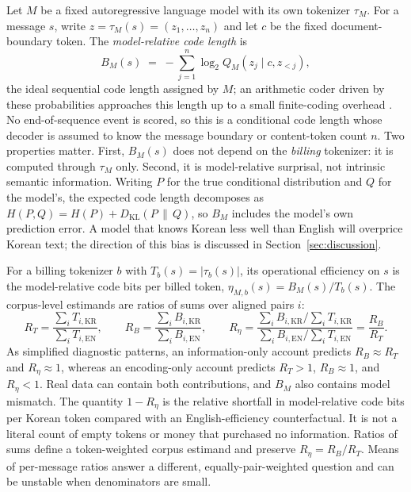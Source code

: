 \documentclass[11pt,a4paper]{article}
\newcommand{\RT}{R_{T}}
\newcommand{\RB}{R_{B}}
\newcommand{\Reta}{R_{\eta}}
\newcommand{\ko}{\mathrm{KR}}
\newcommand{\en}{\mathrm{EN}}
\begin{document}
Let $M$ be a fixed autoregressive language model with its own tokenizer
$\tau_M$. For a message $s$, write $z=\tau_M(s)=(z_1,\dots,z_n)$ and let
$c$ be the fixed document-boundary token. The \emph{model-relative code
length} is
\begin{equation}
  B_M(s) \;=\; -\sum_{j=1}^{n} \log_2 Q_M\!\left(z_j \mid c,z_{<j}\right),
  \label{eq:bits}
\end{equation}
the ideal sequential code length assigned by $M$; an arithmetic coder driven
by these probabilities approaches this length up to a small finite-coding
overhead \citep{mackay2003}. No end-of-sequence event is scored, so this is a
conditional code length whose decoder is assumed to know the message boundary
or content-token count $n$. Two properties matter. First, $B_M(s)$ does not
depend on the \emph{billing} tokenizer: it is computed through $\tau_M$ only.
Second, it is model-relative surprisal, not intrinsic semantic information.
Writing $P$ for the true conditional
distribution and $Q$ for the model's, the expected code length decomposes as
$H(P,Q)=H(P)+D_{\mathrm{KL}}(P\,\|\,Q)$, so $B_M$ includes the model's own
prediction error. A model that knows Korean less well than English will
overprice Korean text; the direction of this bias is discussed in
Section~\ref{sec:discussion}.

For a billing tokenizer $b$ with $T_b(s)=|\tau_b(s)|$, its operational
efficiency on $s$ is the model-relative code bits per billed token,
$\eta_{M,b}(s)=B_M(s)/T_b(s)$. The corpus-level estimands are ratios of
sums over aligned pairs $i$:
\begin{equation}
  \RT=\frac{\sum_i T_{i,\ko}}{\sum_i T_{i,\en}},\qquad
  \RB=\frac{\sum_i B_{i,\ko}}{\sum_i B_{i,\en}},\qquad
  \Reta=\frac{\sum_i B_{i,\ko}/\sum_i T_{i,\ko}}{\sum_i B_{i,\en}/\sum_i T_{i,\en}}
       =\frac{\RB}{\RT}.
  \label{eq:estimands}
\end{equation}
As simplified diagnostic patterns, an information-only account predicts
$\RB\approx\RT$ and $\Reta\approx 1$, whereas an encoding-only account
predicts $\RT>1$, $\RB\approx 1$, and $\Reta<1$. Real data can contain both
contributions, and $B_M$ also contains model mismatch. The quantity
$1-\Reta$ is the relative shortfall in model-relative code bits per Korean
token compared with an English-efficiency counterfactual. It is not a literal count
of empty tokens or money that purchased no information. Ratios of sums define
a token-weighted corpus estimand and preserve $\Reta=\RB/\RT$. Means of
per-message ratios answer a different, equally-pair-weighted question and can
be unstable when denominators are small.
\end{document}
